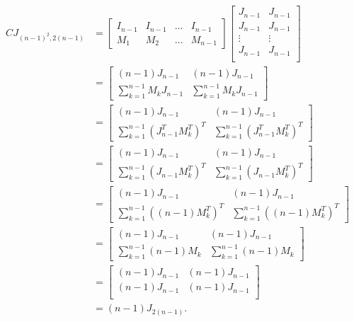 \begin{itemize}
    \begin{align*}
        CJ_{(n-1)^2,2(n-1)}
        &= \begin{bmatrix}
            I_{n-1} & I_{n-1} & \dots & I_{n-1}\\
            M_1 & M_2 & \dots & M_{n-1}
        \end{bmatrix}\begin{bmatrix}
            J_{n-1} & J_{n-1}\\
            J_{n-1} & J_{n-1}\\
            \vdots & \vdots \\
            J_{n-1} & J_{n-1}\\
        \end{bmatrix}\\
        &= \begin{bmatrix}
            (n-1)J_{n-1} & (n-1)J_{n-1}\\
            \sum_{k=1}^{n-1}M_kJ_{n-1} & \sum_{k=1}^{n-1}M_kJ_{n-1}
        \end{bmatrix}\\
        &= \begin{bmatrix}
            (n-1)J_{n-1} & (n-1)J_{n-1}\\
            \sum_{k=1}^{n-1}(J_{n-1}^TM_k^T)^T & \sum_{k=1}^{n-1}(J_{n-1}^TM_k^T)^T
        \end{bmatrix}\\
        &= \begin{bmatrix}
            (n-1)J_{n-1} & (n-1)J_{n-1}\\
            \sum_{k=1}^{n-1}(J_{n-1}M_k^T)^T & \sum_{k=1}^{n-1}(J_{n-1}M_k^T)^T
        \end{bmatrix}\\
        &= \begin{bmatrix}
            (n-1)J_{n-1} & (n-1)J_{n-1}\\
            \sum_{k=1}^{n-1}((n-1)M_k^T)^T & \sum_{k=1}^{n-1}((n-1)M_k^T)^T
        \end{bmatrix}\\
        &= \begin{bmatrix}
            (n-1)J_{n-1} & (n-1)J_{n-1}\\
            \sum_{k=1}^{n-1}(n-1)M_k & \sum_{k=1}^{n-1}(n-1)M_k
        \end{bmatrix}\\
        &= \begin{bmatrix}
            (n-1)J_{n-1} & (n-1)J_{n-1}\\
            (n-1)J_{n-1} & (n-1)J_{n-1}\\
        \end{bmatrix}\\
        &= (n-1)J_{2(n-1)}.
    \end{align*}


\end{itemize}
